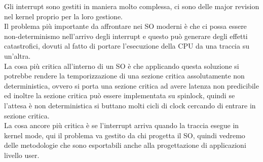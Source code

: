 \documentclass[12pt, oneside]{extbook}
\begin{document}
Gli interrupt sono gestiti in maniera molto complessa, ci sono delle major revision nel kernel proprio per la loro gestione.\\Il problema più importante da affrontare nei SO moderni è che ci possa essere non-determinismo nell'arrivo degli interrupt e questo può generare degli effetti catastrofici, dovuti al fatto di portare l'esecuzione della CPU da una traccia su un'altra.\\La cosa più critica all'interno di un SO è che applicando questa soluzione si potrebbe rendere la temporizzazione di una sezione critica assolutamente non deterministica, ovvero si porta una sezione critica ad avere latenza non predicibile ed inoltre la sezione critica può essere implementata su spinlock, quindi se l'attesa è non deterministica si buttano molti cicli di clock cercando di entrare in sezione critica.\\La cosa ancore più critica è se l'interrupt arriva quando la traccia esegue in kernel mode, qui il problema va gestito da chi progetta il SO, quindi vedremo delle metodologie che sono esportabili anche alla progettazione di applicazioni livello user.
\end{document}
